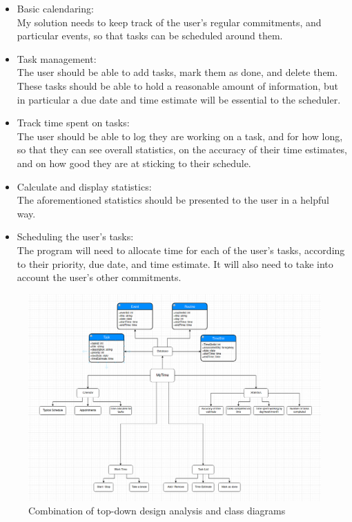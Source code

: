 \documentclass[]{article}
\begin{document}
\begin{itemize}
\item
  Basic calendaring:\\
  My solution needs to keep track of the user's regular commitments, and
  particular events, so that tasks can be scheduled around them.
\item
  Task management:\\
  The user should be able to add tasks, mark them as done, and delete
  them. These tasks should be able to hold a reasonable amount of
  information, but in particular a due date and time estimate will be
  essential to the scheduler.
\item
  Track time spent on tasks:\\
  The user should be able to log they are working on a task, and for how
  long, so that they can see overall statistics, on the accuracy of
  their time estimates, and on how good they are at sticking to their
  schedule.
\item
  Calculate and display statistics:\\
  The aforementioned statistics should be presented to the user in a
  helpful way.
\item
  Scheduling the user's tasks:\\
  The program will need to allocate time for each of the user's tasks,
  according to their priority, due date, and time estimate. It will also
  need to take into account the user's other commitments.
\end{itemize}

\begin{figure}
\hypertarget{fig:TDD1}{%
\centering
\includegraphics{./tex2pdf.-ae8b3c0afe160db8/7959c99de77473494c0ebd821b4edccdfa48a594.png}
\caption{Combination of top-down design analysis and class
diagrams{}}\label{fig:TDD1}
}
\end{figure}
\end{document}
